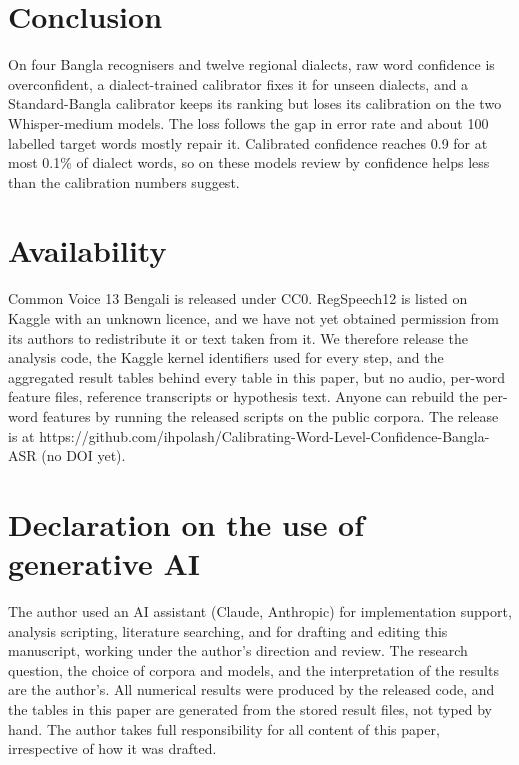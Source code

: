 \documentclass[10pt]{article}
\begin{document}
\section{Conclusion}

On four Bangla recognisers and twelve regional dialects, raw word confidence is overconfident, a dialect-trained calibrator fixes it for unseen dialects, and a Standard-Bangla calibrator keeps its ranking but loses its calibration on the two Whisper-medium models. The loss follows the gap in error rate and about 100 labelled target words mostly repair it. Calibrated confidence reaches 0.9 for at most 0.1\% of dialect words, so on these models review by confidence helps less than the calibration numbers suggest.


\section*{Availability}

Common Voice 13 Bengali is released under CC0. RegSpeech12 is listed on Kaggle with an unknown licence, and we have not yet obtained permission from its authors to redistribute it or text taken from it. We therefore release the analysis code, the Kaggle kernel identifiers used for every step, and the aggregated result tables behind every table in this paper, but no audio, per-word feature files, reference transcripts or hypothesis text. Anyone can rebuild the per-word features by running the released scripts on the public corpora. The release is at https://github.com/ihpolash/Calibrating-Word-Level-Confidence-Bangla-ASR (no DOI yet).


\section*{Declaration on the use of generative AI}

The author used an AI assistant (Claude, Anthropic) for implementation support, analysis scripting, literature searching, and for drafting and editing this manuscript, working under the author's direction and review. The research question, the choice of corpora and models, and the interpretation of the results are the author's. All numerical results were produced by the released code, and the tables in this paper are generated from the stored result files, not typed by hand. The author takes full responsibility for all content of this paper, irrespective of how it was drafted.
\end{document}
